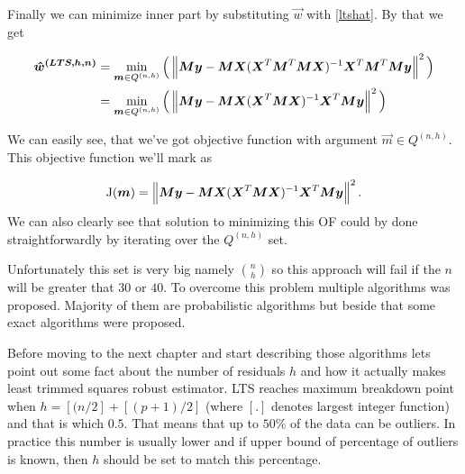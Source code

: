 Finally we can minimize inner part by substituting $\vec{w}$ with \ref{ltshat}. By that we get

\begin{align*}
    \boldsymbol{\hat{w}^{(LTS, h, n)}}
    &=  \operatorname*{min}_{\boldsymbol{m} \in Q^{(n,h)}} 
    \Big( \left\lVert \boldsymbol{M}\boldsymbol{y} -  \boldsymbol{M}\boldsymbol{X}(\boldsymbol{X}^T\boldsymbol{M}^T\boldsymbol{M}\boldsymbol{X})^{-1}\boldsymbol{X}^T\boldsymbol{M}^T\boldsymbol{M}\boldsymbol{y}  \right\rVert^2 \Big)\\
    &= \operatorname*{min}_{\boldsymbol{m} \in Q^{(n,h)}} 
    \Big( \left\lVert \boldsymbol{M}\boldsymbol{y} -  \boldsymbol{M}\boldsymbol{X}(\boldsymbol{X}^T\boldsymbol{M}\boldsymbol{X})^{-1}\boldsymbol{X}^T\boldsymbol{M}\boldsymbol{y}  \right\rVert^2 \Big)
\end{align*}

We can easily see, that we've got objective function with argument $\vec{m} \in Q^{(n,h)}$. This objective function we'll mark as 

\begin{equation} 
    \operatorname{J}(\boldsymbol{m}) =  \left\lVert \boldsymbol{M}\boldsymbol{y} -  \boldsymbol{M}\boldsymbol{X}(\boldsymbol{X}^T\boldsymbol{M}\boldsymbol{X})^{-1}\boldsymbol{X}^T\boldsymbol{M}\boldsymbol{y}  \right\rVert^2.
\end{equation}
We can also clearly see that solution to minimizing this OF could by done straightforwardly by iterating over the  $Q^{(n,h)}$ set.

Unfortunately this set is very big namely $\binom{n}{h}$ so this approach will fail if the $n$ will be greater that $30$ or $40$. To overcome this problem multiple algorithms was proposed. Majority of them are probabilistic algorithms but beside that some exact algorithms were proposed. 

Before moving to the next chapter and start describing those algorithms lets point out some fact about the number of residuals $h$ and how it actually makes least trimmed squares robust estimator.
LTS reaches maximum breakdown point when $h = [(n/2] + [(p+1)/2]$ (where $[.]$ denotes largest integer function) and that is  which $0.5$. That means that up to $50\%$ of the data can be outliers. In practice this number is usually lower and if upper bound of percentage of outliers is known, then $h$ should be set to match this percentage.




